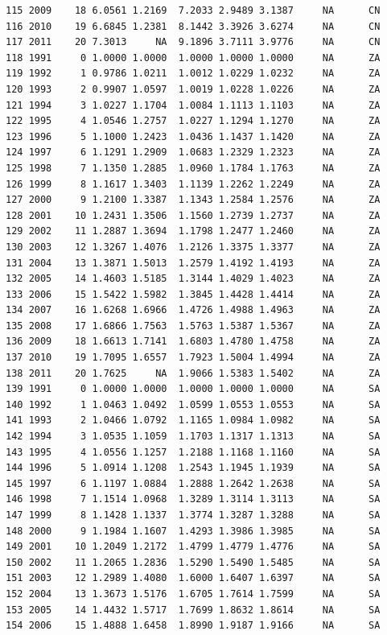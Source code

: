 \documentclass[preprint,authoryear,12pt]{elsarticle}\usepackage{graphicx, color}
\makeatletter
\newenvironment{kframe}{%
 \def\at@end@of@kframe{}%
 \ifinner\ifhmode%
  \def\at@end@of@kframe{\end{minipage}}%
  \begin{minipage}{\columnwidth}%
 \fi\fi%
 \def\FrameCommand##1{\hskip\@totalleftmargin \hskip-\fboxsep
 \colorbox{shadecolor}{##1}\hskip-\fboxsep
     \hskip-\linewidth \hskip-\@totalleftmargin \hskip\columnwidth}%
 \MakeFramed {\advance\hsize-\width
   \@totalleftmargin\z@ \linewidth\hsize
   \@setminipage}}%
 {\par\unskip\endMakeFramed%
 \at@end@of@kframe}
\newenvironment{knitrout}{}{} %
\makeatother
\begin{document}
\begin{knitrout}
\begin{kframe}
\begin{verbatim}
115 2009    18 6.0561 1.2169  7.2033 2.9489 3.1387     NA      CN
116 2010    19 6.6845 1.2381  8.1442 3.3926 3.6274     NA      CN
117 2011    20 7.3013     NA  9.1896 3.7111 3.9776     NA      CN
118 1991     0 1.0000 1.0000  1.0000 1.0000 1.0000     NA      ZA
119 1992     1 0.9786 1.0211  1.0012 1.0229 1.0232     NA      ZA
120 1993     2 0.9907 1.0597  1.0019 1.0228 1.0226     NA      ZA
121 1994     3 1.0227 1.1704  1.0084 1.1113 1.1103     NA      ZA
122 1995     4 1.0546 1.2757  1.0227 1.1294 1.1270     NA      ZA
123 1996     5 1.1000 1.2423  1.0436 1.1437 1.1420     NA      ZA
124 1997     6 1.1291 1.2909  1.0683 1.2329 1.2323     NA      ZA
125 1998     7 1.1350 1.2885  1.0960 1.1784 1.1763     NA      ZA
126 1999     8 1.1617 1.3403  1.1139 1.2262 1.2249     NA      ZA
127 2000     9 1.2100 1.3387  1.1343 1.2584 1.2576     NA      ZA
128 2001    10 1.2431 1.3506  1.1560 1.2739 1.2737     NA      ZA
129 2002    11 1.2887 1.3694  1.1798 1.2477 1.2460     NA      ZA
130 2003    12 1.3267 1.4076  1.2126 1.3375 1.3377     NA      ZA
131 2004    13 1.3871 1.5013  1.2579 1.4192 1.4193     NA      ZA
132 2005    14 1.4603 1.5185  1.3144 1.4029 1.4023     NA      ZA
133 2006    15 1.5422 1.5982  1.3845 1.4428 1.4414     NA      ZA
134 2007    16 1.6268 1.6966  1.4726 1.4988 1.4963     NA      ZA
135 2008    17 1.6866 1.7563  1.5763 1.5387 1.5367     NA      ZA
136 2009    18 1.6613 1.7141  1.6803 1.4780 1.4758     NA      ZA
137 2010    19 1.7095 1.6557  1.7923 1.5004 1.4994     NA      ZA
138 2011    20 1.7625     NA  1.9066 1.5383 1.5402     NA      ZA
139 1991     0 1.0000 1.0000  1.0000 1.0000 1.0000     NA      SA
140 1992     1 1.0463 1.0492  1.0599 1.0553 1.0553     NA      SA
141 1993     2 1.0466 1.0792  1.1165 1.0984 1.0982     NA      SA
142 1994     3 1.0535 1.1059  1.1703 1.1317 1.1313     NA      SA
143 1995     4 1.0556 1.1257  1.2188 1.1168 1.1160     NA      SA
144 1996     5 1.0914 1.1208  1.2543 1.1945 1.1939     NA      SA
145 1997     6 1.1197 1.0884  1.2888 1.2642 1.2638     NA      SA
146 1998     7 1.1514 1.0968  1.3289 1.3114 1.3113     NA      SA
147 1999     8 1.1428 1.1337  1.3774 1.3287 1.3288     NA      SA
148 2000     9 1.1984 1.1607  1.4293 1.3986 1.3985     NA      SA
149 2001    10 1.2049 1.2172  1.4799 1.4779 1.4776     NA      SA
150 2002    11 1.2065 1.2836  1.5290 1.5490 1.5485     NA      SA
151 2003    12 1.2989 1.4080  1.6000 1.6407 1.6397     NA      SA
152 2004    13 1.3673 1.5176  1.6705 1.7614 1.7599     NA      SA
153 2005    14 1.4432 1.5717  1.7699 1.8632 1.8614     NA      SA
154 2006    15 1.4888 1.6458  1.8990 1.9187 1.9166     NA      SA

\end{verbatim}
\end{kframe}
\end{knitrout}
\end{document}
